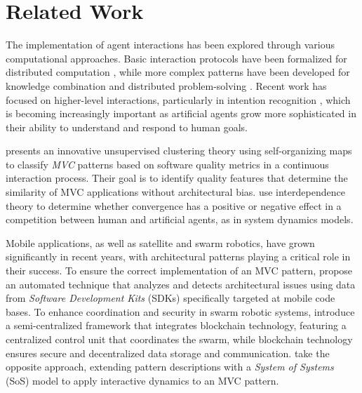 \section{Related Work}
\label{sec:relwork}
The implementation of agent interactions has been explored through various computational approaches. Basic interaction protocols have been formalized for distributed computation \cite{AspnesR09}, while more complex patterns have been developed for knowledge combination \cite{AndreoliBP94,BorghoffS96} and distributed problem-solving \cite{BorghoffPAF98}. Recent work has focused on higher-level interactions, particularly in intention recognition \cite{GreefDGL07,IngaRRNRKDLTNMH23}, which is becoming increasingly important as artificial agents grow more sophisticated in their ability to understand and respond to human goals.

\cite{GuamanDP21} presents an innovative unsupervised clustering theory using self-or\-ga\-niz\-ing maps to classify \textit{MVC} patterns based on software quality metrics in a continuous interaction process. Their goal is to identify quality features that determine the similarity of MVC applications without architectural bias.
\cite{LawlessS21} use interdependence theory to determine whether convergence has a positive or negative effect in a competition between human and artificial agents, as in system dynamics models. 

Mobile applications, as well as satellite and swarm robotics, have grown significantly in recent years, with architectural patterns playing a critical role in their success. To ensure the correct implementation of an MVC pattern, \cite{DobreanD22} propose an automated technique that analyzes and detects architectural issues using data from {\em Software Development Kits} (SDKs) specifically targeted at mobile code bases.
To enhance coordination and security in swarm robotic systems, \cite{carovilla2023integrating} introduce a semi-centralized framework that integrates blockchain technology, featuring a centralized control unit that coordinates the swarm, while blockchain technology ensures secure and decentralized data storage and communication.
%
\cite{KumarC23} take the opposite approach, extending pattern descriptions with a {\em System of Systems} (SoS) model to apply interactive dynamics to an MVC pattern.

